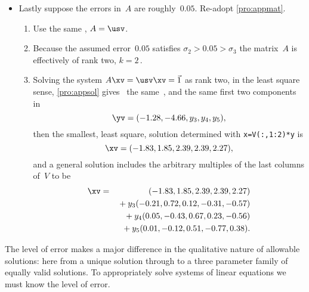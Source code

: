 \begin{example}
\begin{solution}
\begin{itemize}
\item Lastly suppose the errors in~\(A\) are roughly~\(0.05\).
Re-adopt \autoref{pro:appmat}.
\begin{enumerate}
\item Use the same \svd, \(A=\usv\).
\item Because the assumed error~\(0.05\) satisfies \(\sigma_2>0.05>\sigma_3\) the matrix~\(A\) is effectively of rank two, \(k=2\)\,.
\item Solving the system \(A\xv=\usv\xv=\vec1\) as rank two, in the least square sense, \autoref{pro:appsol} gives \twodp\ the same~\zv, and the same first two components in
\begin{equation*}
\yv=(-1.28,-4.66,y_3,y_4,y_5),
\end{equation*}
then the smallest, least square, solution determined with 
\verb|x=V(:,1:2)*y| is
\begin{equation*}
\xv=(-1.83,1.85,2.39,2.39,2.27),
\end{equation*}
and a general solution includes the arbitrary multiples of the last columns of~\(V\) to be
\begin{eqnarray*}
\xv&=&(-1.83,1.85,2.39,2.39,2.27)
\\&&{}+y_3(-0.21,0.72,0.12,-0.31,-0.57)
\\&&{}+y_4(0.05,-0.43,0.67,0.23,-0.56)
\\&&{}+y_5(0.01,-0.12,0.51,-0.77,0.38).
\end{eqnarray*}
\end{enumerate}
\end{itemize}
The level of error makes a major difference in the qualitative nature of allowable solutions: here from a unique solution through to a three parameter family of equally valid solutions.
To appropriately solve systems of linear equations we must know the level of error.
\end{solution}
\end{example}




